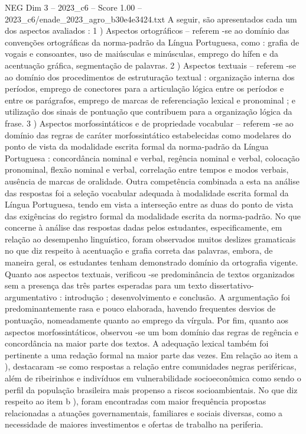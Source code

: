 \begin{textsample}{NEG Dim 3 – 2023\_c6 – Score 1.00 – 2023\_c6/enade\_2023\_agro\_b30e4e3424.txt}
A seguir, são apresentados cada um dos aspectos avaliados : 1 ) Aspectos ortográficos – referem -se ao domínio das convenções ortográficas da norma-padrão da Língua Portuguesa, como : grafia de vogais e consoantes, uso de maiúsculas e minúsculas, emprego do hífen e da acentuação gráfica, segmentação de palavras. 2 ) Aspectos textuais – referem -se ao domínio dos procedimentos de estruturação textual : organização interna dos períodos, emprego de conectores para a articulação lógica entre os períodos e entre os parágrafos, emprego de marcas de referenciação lexical e pronominal ; e utilização dos sinais de pontuação que contribuem para a organização lógica da frase. 3 ) Aspectos morfossintáticos e de propriedade vocabular – referem -se ao domínio das regras de caráter morfossintático estabelecidas como modelares do ponto de vista da modalidade escrita formal da norma-padrão da Língua Portuguesa : concordância nominal e verbal, regência nominal e verbal, colocação pronominal, flexão nominal e verbal, correlação entre tempos e modos verbais, ausência de marcas de oralidade.
Outra competência combinada a esta na análise das respostas foi a seleção vocabular adequada à modalidade escrita formal da Língua Portuguesa, tendo em vista a interseção entre as duas do ponto de vista das exigências do registro formal da modalidade escrita da norma-padrão.
No que concerne à análise das respostas dadas pelos estudantes, especificamente, em relação ao desempenho linguístico, foram observados muitos deslizes gramaticais no que diz respeito à acentuação e grafia correta das palavras, embora, de maneira geral, os estudantes tenham demonstrado domínio da ortografia vigente.
Quanto aos aspectos textuais, verificou -se predominância de textos organizados sem a presença das três partes esperadas para um texto dissertativo-argumentativo : introdução ; desenvolvimento e conclusão.
A argumentação foi predominantemente rasa e pouco elaborada, havendo frequentes desvios de pontuação, nomeadamente quanto ao emprego da vírgula.
Por fim, quanto aos aspectos morfossintáticos, observou -se um bom domínio das regras de regência e concordância na maior parte dos textos.
A adequação lexical também foi pertinente a uma redação formal na maior parte das vezes.
Em relação ao item a ), destacaram -se como respostas a relação entre comunidades negras periféricas, além de ribeirinhos e indivíduos em vulnerabilidade socioeconômica como sendo o perfil da população brasileira mais propenso a riscos socioambientais.
No que diz respeito ao item b ), foram encontradas com maior frequência propostas relacionadas a atuações governamentais, familiares e sociais diversas, como a necessidade de maiores investimentos e ofertas de trabalho na periferia.

\end{textsample}
